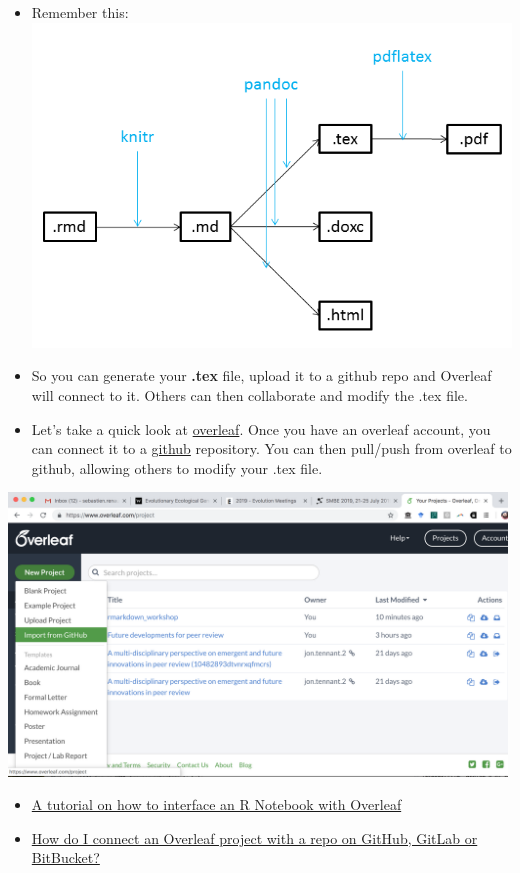 \documentclass[]{article}
\begin{document}
\begin{itemize}
\item
  Remember this:\\
  \includegraphics[width=5.20833in,height=\textheight]{../figures/pandoc1.png}
\item
  So you can generate your \textbf{.tex} file, upload it to a github
  repo and Overleaf will connect to it. Others can then collaborate and
  modify the .tex file.
\item
  Let's take a quick look at \href{https://www.overleaf.com/}{overleaf}.
  Once you have an overleaf account, you can connect it to a
  \href{https://www.github.com/}{github} repository. You can then
  pull/push from overleaf to github, allowing others to modify your .tex
  file.
\end{itemize}

\includegraphics[width=5.20833in,height=\textheight]{../figures/overleaf_github.png}

\begin{itemize}
\item
  \href{https://medium.com/@arinbasu/a-tutorial-on-how-to-interface-an-r-notebook-with-overleaf-11f23c306cfd}{A
  tutorial on how to interface an R Notebook with Overleaf}
\item
  \href{https://www.overleaf.com/learn/how-to/How_do_I_connect_an_Overleaf_project_with_a_repo_on_GitHub,_GitLab_or_BitBucket\%3F}{How
  do I connect an Overleaf project with a repo on GitHub, GitLab or
  BitBucket?}
\end{itemize}
\end{document}
